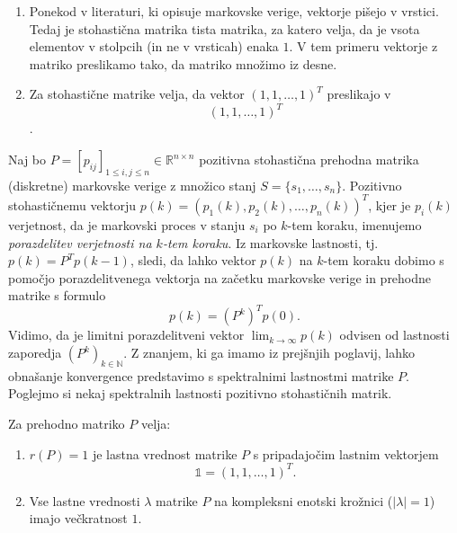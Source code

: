 \documentclass[mat1]{fmfdelo}
\newcommand{\R}{\mathbb R}
\newcommand{\N}{\mathbb N}
\begin{document}
\begin{opomba}
    \leavevmode
    \begin{enumerate}
        \item Ponekod v literaturi, ki opisuje markovske verige, vektorje pišejo v vrstici. Tedaj je stohastična matrika tista matrika, za katero velja, da je vsota elementov v stolpcih (in ne v vrsticah) enaka $1$. V tem primeru vektorje z matriko preslikamo tako, da matriko množimo iz desne.
        \item Za stohastične matrike velja, da vektor $(1, 1, \ldots, 1)^T$ preslikajo v \[(1, 1, \ldots, 1)^T\].
    \end{enumerate}
\end{opomba}

Naj bo $P = [p_{ij}]_{1 \leq i,j \leq n} \in \R^{n \times n}$ pozitivna stohastična prehodna matrika (diskretne) markovske verige z množico stanj $S = \{s_1, \ldots, s_n\}$. Pozitivno stohastičnemu vektorju $p(k) = \left(p_1(k), p_2(k), \ldots, p_n(k)\right)^T$, kjer je $p_i(k)$ verjetnost, da je markovski proces v stanju $s_i$ po $k$-tem koraku, imenujemo \emph{porazdelitev verjetnosti na $k$-tem koraku}. Iz markovske lastnosti, tj. $p(k) = P^T p(k-1)$, sledi, da lahko vektor $p(k)$ na $k$-tem koraku dobimo s pomočjo porazdelitvenega vektorja na začetku markovske verige in prehodne matrike s formulo
\begin{equation}\label{eqKtiKorakMarkov}
    p(k) = (P^k)^T p(0).
\end{equation}
Vidimo, da je limitni porazdelitveni vektor $\lim_{k\rightarrow\infty} p(k)$ odvisen od lastnosti zaporedja $(P^k)_{k\in\N}$. Z znanjem, ki ga imamo iz prejšnjih poglavij, lahko obnašanje konvergence predstavimo s spektralnimi lastnostmi matrike $P$. Poglejmo si nekaj spektralnih lastnosti pozitivno stohastičnih matrik.
\begin{trditev}
    Za prehodno matriko $P$ velja:
    \begin{enumerate}
        \item $r(P) = 1$ je lastna vrednost matrike $P$ s pripadajočim lastnim vektorjem
        \begin{equation*}
            \mathds{1} = (1, 1, \ldots, 1)^T.
        \end{equation*}
        \item Vse lastne vrednosti $\lambda$ matrike $P$ na kompleksni enotski krožnici ($|\lambda|=1$) imajo večkratnost $1$.
    \end{enumerate}
\end{trditev}
\end{document}
